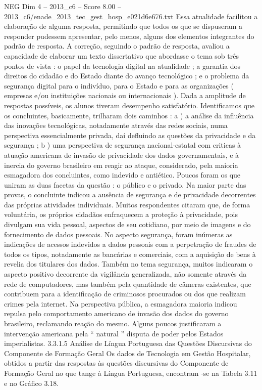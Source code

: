 \begin{textsample}{NEG Dim 4 – 2013\_c6 – Score 8.00 – 2013\_c6/enade\_2013\_tec\_gest\_hosp\_e021d6e676.txt}
Essa atualidade facilitou a elaboração de alguma resposta, permitindo que todos os que se dispuseram a responder pudessem apresentar, pelo menos, alguns dos elementos integrantes do padrão de resposta.
A correção, seguindo o padrão de resposta, avaliou a capacidade de elaborar um texto dissertativo que abordasse o tema sob três pontos de vista : o papel da tecnologia digital na atualidade ; a garantia dos direitos do cidadão e do Estado diante do avanço tecnológico ; e o problema da segurança digital para o indivíduo, para o Estado e para as organizações ( empresas e/ou instituições nacionais ou internacionais ).
Dada a amplitude de respostas possíveis, os alunos tiveram desempenho satisfatório.
Identificamos que os concluintes, basicamente, trilharam dois caminhos : a ) a análise da influência das inovações tecnológicas, notadamente através das redes sociais, numa perspectiva essencialmente privada, daí defluindo as questões da privacidade e da segurança ; b ) uma perspectiva de segurança nacional-estatal com criticas à atuação americana de invasão de privacidade dos dados governamentais, e à inercia do governo brasileiro em reagir ao ataque, considerado, pela maioria esmagadora dos concluintes, como indevido e antiético.
Poucos foram os que uniram as duas facetas da questão : o público e o privado.
Na maior parte das provas, o concluinte indicou a ausência de segurança e de privacidade decorrentes das próprias atividades individuais.
Muitos respondentes citaram que, de forma voluntária, os próprios cidadãos enfraquecem a proteção à privacidade, pois divulgam sua vida pessoal, aspectos de seu cotidiano, por meio de imagens e do fornecimento de dados pessoais.
No aspecto segurança, foram inúmeras as indicações de acessos indevidos a dados pessoais com a perpetração de fraudes de todos os tipos, notadamente as bancárias e comerciais, com a aquisição de bens à revelia dos titulares dos dados.
Também no tema segurança, muitos indicaram o aspecto positivo decorrente da vigilância generalizada, não somente através da rede de computadores, mas também pela quantidade de câmeras existentes, que contribuem para a identificação de criminosos procurados ou dos que realizam crimes pela internet.
Na perspectiva pública, a esmagadora maioria indicou repulsa pelo comportamento americano de invasão dos dados do governo brasileiro, reclamando reação do mesmo.
Alguns poucos justificaram a intervenção americana pela “ natural ” disputa de poder pelos Estados imperialistas. 3.3.1.5 Análise de Língua Portuguesa das Questões Discursivas do Componente de Formação Geral Os dados de Tecnologia em Gestão Hospitalar, obtidos a partir das respostas às questões discursivas do Componente de Formação Geral no que tange à Língua Portuguesa, encontram -se na Tabela 3.11 e no Gráfico 3.18.

\end{textsample}
